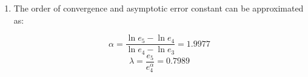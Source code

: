 \documentclass[12pt]{article}
\begin{document}
\begin{description}
\begin{enumerate} [label=(\alph*)]
	        Fixed point iteration converges for the interval $[a,b]$ if $|g'(x)| < 1$ for $x \in [a,b]$.
	        	
	        \begin{equation*}
	        	|g'(x)| = \left| \frac{f(x)f''(x)}{(f'(x))^2} \right|
	        \end{equation*}
	        	
	        $f(x) = -2x^3 + x - e^{-x} - 1$ \\
	        $f'(x) = -6x^2 + 1 + e^{-x}$ \\
	        $f''(x) = -12x - e^{-x}$ \\
	        	
	        Plugging this equation into Python and plotting, we can see that $\exists x \in [-3,3], \; |g'(x)| > 1 \implies$ FPI and the Newton Method are not guaranteed to converge on the interval [-3,3].
	        	
	
	        \item The order of convergence and asymptotic error constant can be approximated as:
   	
   	        \begin{equation*}
   	             \alpha= \frac{\ln e_{5}-\ln e_4}{\ln e_4 - \ln e_{3}} = 1.9977
   	        \end{equation*}
   	         \begin{equation*}
   	                     \lambda= \dfrac{e_5}{e_{4}^\alpha} = 0.7989
   	        \end{equation*}
		
\end{enumerate}
\color{black}
\fi


\end{description}
\end{document}
